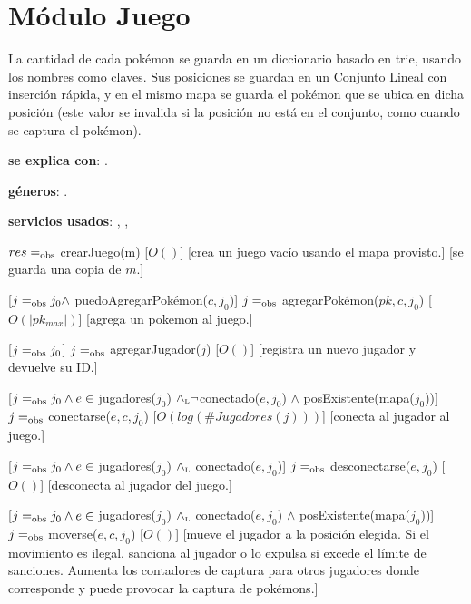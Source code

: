 \section{Módulo Juego}

La cantidad de cada pokémon se guarda en un diccionario basado en trie, usando los nombres como claves. Sus posiciones se guardan en un Conjunto Lineal con inserción rápida, y en el mismo mapa se guarda el pokémon que se ubica en dicha posición (este valor se invalida si la posición no está en el conjunto, como cuando se captura el pokémon). 

\begin{Interfaz}

	\textbf{se explica con}: .

	\textbf{géneros}: .

	\textbf{servicios usados}: , , 


	{$res =_{\mathrm{obs}}$ crearJuego(m)}
	[$O()$]
	[crea un juego vacío usando el mapa provisto.]
	[se guarda una copia de $m$.]

	[$j =_{\mathrm{obs}} j_0 \land$ puedoAgregarPokémon($c,j_0$)]
	{$j =_{\mathrm{obs}}$ agregarPokémon($pk, c, j_0$)}
	[$O(|pk_{max}|)$]
	[agrega un pokemon al juego.]

	[$j =_{\mathrm{obs}} j_0$]
	{$j =_{\mathrm{obs}}$ agregarJugador($j$)}
	[$O()$]
	[registra un nuevo jugador y devuelve su ID.]

	[$j =_{\mathrm{obs}} j_0 \land e \in$ jugadores($j_0$) $\land_{\mathrm{\scriptscriptstyle{L}}} \neg$conectado($e,j_0$) $\land$ posExistente(mapa($j_0$))]
	{$j =_{\mathrm{obs}}$ conectarse($e, c, j_0$)}
	[$O(log(\#Jugadores(j)))$]
	[conecta al jugador al juego.]

	[$j =_{\mathrm{obs}} j_0 \land e \in$ jugadores($j_0$) $\land_{\mathrm{\scriptscriptstyle{L}}}$ conectado($e,j_0$)]
	{$j =_{\mathrm{obs}}$ desconectarse($e, j_0$)}
	[$O()$]
	[desconecta al jugador del juego.]

	[$j =_{\mathrm{obs}} j_0 \land e \in$ jugadores($j_0$) $\land_{\mathrm{\scriptscriptstyle{L}}}$ conectado($e,j_0$) $\land$ posExistente(mapa($j_0$))]
	{$j =_{\mathrm{obs}}$ moverse($e, c, j_0$)}
	[$O()$]
	[mueve el jugador a la posición elegida. Si el movimiento es ilegal, sanciona al jugador o lo expulsa si excede el límite de sanciones. Aumenta los contadores de captura para otros jugadores donde corresponde y puede provocar la captura de pokémons.]


\end{Interfaz}
